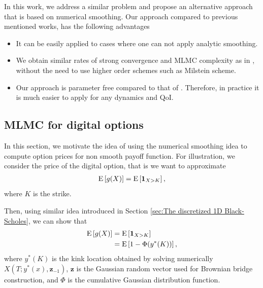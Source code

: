 In this work, we address a similar problem and  propose an alternative approach that is  based on numerical smoothing. Our approach compared to previous mentioned works, has the following advantages
\begin{itemize}
\item It can be easily applied to cases where one can not apply analytic smoothing.
\item We obtain similar  rates of strong convergence and MLMC complexity  as in  \cite{giles2008improved,giles2013numerical}, without the need to use higher order schemes such as Milstein scheme.
\item Our approach is parameter free compared to that of  \cite{giles2015multilevel}. Therefore, in practice it is much easier to apply for any dynamics and QoI.
\end{itemize} 

\subsection{MLMC for digital options}\label{sec: MLMC for digital options}
In this section, we motivate the idea of using the numerical smoothing idea to compute option prices for non smooth payoff function. For illustration, we consider  the price of the digital option, that is we want to approximate
\begin{align}
\mathrm{E}\left[g(X)\right]=\mathrm{E}\left[\mathbf{1}_{X>K}\right],
\end{align}
where $K$ is the strike. 

Then, using similar idea introduced in Section \ref{sec:The discretized 1D Black-Scholes}, we can show that
\begin{align}
\mathrm{E}\left[g(X)\right]&=\mathrm{E}\left[\mathbf{1}_{X>K}\right]\nonumber\\
&=\mathrm{E}\left[1-\Phi(y^\ast(K))\right],
\end{align}
where $y^\ast(K)$ is the kink location obtained by solving numerically $X(T; y^\ast(x), \mathbf{z}_{-1})$, $\mathbf{z}$ is the Gaussian random  vector used for Brownian bridge construction, and $\Phi$ is the cumulative Gaussian distribution function.

